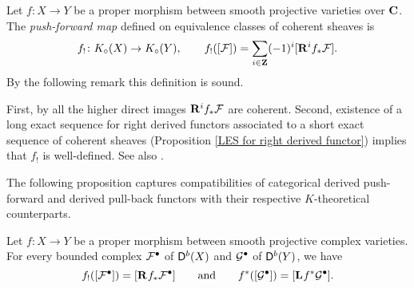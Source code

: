 \begin{definition}
    Let $f \colon X \to Y$ be a proper morphism between smooth projective varieties over $\mathbf C$. 
    The \emph{push-forward map} defined on equivalence classes of coherent sheaves is
    \[
        f_! \colon K_{\circ}(X) \to K_{\circ}(Y), \qquad f_!([\mathcal F]) = \sum_{i \in \mathbf Z}(-1)^i[\mathbf{R}^{i}f_*\mathcal F].
    \]
    By the following remark this definition is sound.
\end{definition}

\begin{remark}
    First, by \cite[\S III.3.2, Theorem 3.2.1]{EGA} all the higher direct images $\mathbf{R}^{i}f_*\mathcal F$ are coherent.
    Second, existence of a long exact sequence for right derived functors associated to a short exact sequence of coherent sheaves (Proposition \ref{LES for right derived functor}) implies that $f_!$ is well-defined. See also \cite[\S II, Lemma 6.2.6]{Weibel2013}.
\end{remark}

The following proposition captures compatibilities of categorical derived push-forward and derived pull-back functors with their respective $K$-theoretical counterparts.  

\begin{proposition}
    \label{push-forward and pull-back compatibilities}
    Let $f \colon X \to Y$ be a proper morphism between smooth projective complex varieties. For every bounded complex $\mathcal F^\bullet$ of $\mathsf{D}^b(X)$ and $\mathcal G^\bullet$ of $\mathsf{D}^b(Y)$, we have
    \[
        f_!([\mathcal F^\bullet]) = [\mathbf{R}^{}f_*\mathcal F^\bullet] \qquad \text{and} \qquad f^*([\mathcal G^\bullet]) = [\mathbf{L}^{}f^*\mathcal G^\bullet].
    \]
\end{proposition}

